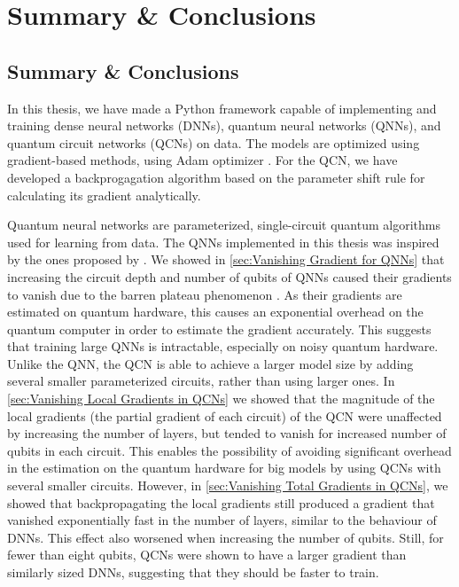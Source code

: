 \chapter{Summary \& Conclusions}\label{chap:Conclusion}

\section{Summary \& Conclusions}\label{sec:Summary}
In this thesis, we have made a Python framework capable of implementing and training dense neural networks (DNNs), quantum neural networks (QNNs), and quantum circuit networks (QCNs) on data. The models are optimized using gradient-based methods, using Adam optimizer \cite{kingma2017adam}. For the QCN, we have developed a backprogagation algorithm based on the parameter shift rule for calculating its gradient analytically.

Quantum neural networks are parameterized, single-circuit quantum algorithms used for learning from data. The QNNs implemented in this thesis was inspired by the ones proposed by \citet{abbas2020power}. We showed in \cref{sec:Vanishing Gradient for QNNs} that increasing the circuit depth and number of qubits of QNNs caused their gradients to vanish due to the barren plateau phenomenon \cite{McClean_2018}. As their gradients are estimated on quantum hardware, this causes an exponential overhead on the quantum computer in order to estimate the gradient accurately. This suggests that training large QNNs is intractable, especially on noisy quantum hardware. Unlike the QNN, the QCN is able to achieve a larger model size by adding several smaller parameterized circuits, rather than using larger ones. In \cref{sec:Vanishing Local Gradients in QCNs} we showed that the magnitude of the local gradients (the partial gradient of each circuit) of the QCN were unaffected by increasing the number of layers, but tended to vanish for increased number of qubits in each circuit. This enables the possibility of avoiding significant overhead in the estimation on the quantum hardware for big models by using QCNs with several smaller circuits. However, in \cref{sec:Vanishing Total Gradients in QCNs}, we showed that backpropagating the local gradients still produced a gradient that vanished exponentially fast in the number of layers, similar to the behaviour of DNNs. This effect also worsened when increasing the number of qubits. Still, for fewer than eight qubits, QCNs were shown to have a larger gradient than similarly sized DNNs, suggesting that they should be faster to train.

